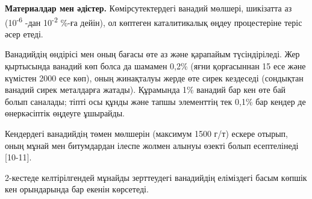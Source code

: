 \begin{multicols}{2}
{\bfseries Материалдар мен әдістер.} Көмірсутектердегі ванадий мөлшері, шикізатта аз
(10\textsuperscript{-6} -дан 10\textsuperscript{-2} \%-ға дейін), ол
көптеген каталитикалық өңдеу процестеріне теріс әсер етеді.

Ванадийдің өндірісі мен оның бағасы өте аз және қарапайым түсіндіріледі.
Жер қыртысында ванадий көп болса да шамамен 0,2\% (яғни қорғасыннан 15
есе және күмістен 2000 есе көп), оның жинақталуы жерде өте сирек
кездеседі (сондықтан ванадий сирек металдарға жатады). Құрамында 1\%
ванадий бар кен өте бай болып саналады; тіпті осы құнды және тапшы
элементтің тек 0,1\% бар кендер де өнеркәсіптік өңдеуге ұшырайды.

Кендердегі ванадийдің төмен мөлшерін (максимум 1500 г/т) ескере отырып,
оның мұнай мен битумдардан ілеспе жолмен алынуы өзекті болып
есептелінеді {[}10-11{]}.

2-кестеде келтірілгендей мұнайды зерттеудегі ванадийдің еліміздегі басым
көпшік кен орындарында бар екенін көрсетеді.
\end{multicols}

